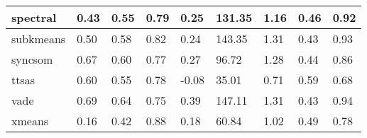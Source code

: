 \begin{table}[H]
\begin{tabular}{|l|l|l|l|l|l|l|l|l|}
\hline
spectral & 0.43 & 0.55 & 0.79 & 0.25 & 131.35 & 1.16 & 0.46 & 0.92 \\
\hline
subkmeans & 0.50 & 0.58 & 0.82 & 0.24 & 143.35 & 1.31 & 0.43 & 0.93 \\
\hline
syncsom & 0.67 & 0.60 & 0.77 & 0.27 & 96.72 & 1.28 & 0.44 & 0.86 \\
\hline
ttsas & 0.60 & 0.55 & 0.78 & -0.08 & 35.01 & 0.71 & 0.59 & 0.68 \\
\hline
vade & 0.69 & 0.64 & 0.75 & 0.39 & 147.11 & 1.31 & 0.43 & 0.94 \\
\hline
xmeans & 0.16 & 0.42 & 0.88 & 0.18 & 60.84 & 1.02 & 0.49 & 0.78 \\
\hline
\end{tabular}
\end{table}